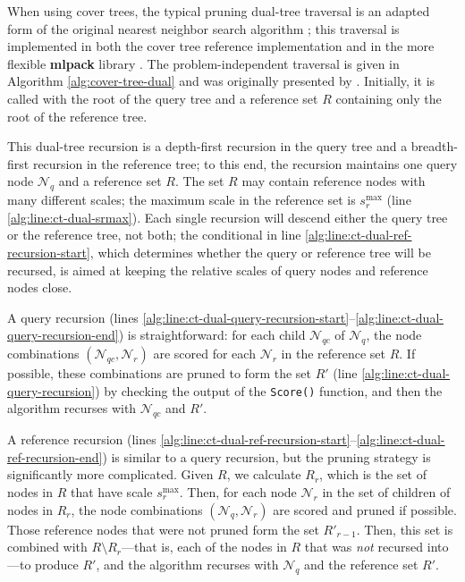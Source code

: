 When using cover trees, the typical pruning dual-tree traversal is an adapted
form of the original nearest neighbor search algorithm \citep[see
\texttt{Find-All-Nearest},][]{langford2006}; this traversal is implemented in
both the cover tree reference implementation and in the more flexible {\bf
mlpack} library \citep{mlpack2013}.  The problem-independent traversal is given
in Algorithm \ref{alg:cover-tree-dual} and was originally presented by
\citet{curtin2014dual}.  Initially, it is called with the root of the query tree
and a reference set $R$ containing only the root of the reference tree.

This dual-tree recursion is a depth-first recursion in the query tree and a
breadth-first recursion in the reference tree; to this end, the recursion
maintains one query node $\mathscr{N}_q$ and a reference set $R$.  The set $R$
may contain reference nodes with many different scales; the maximum scale in the
reference set is $s_r^{\max}$ (line \ref{alg:line:ct-dual-srmax}).  Each single
recursion will descend either the query tree or the reference tree, not both;
the conditional in line \ref{alg:line:ct-dual-ref-recursion-start}, which
determines whether the query or reference tree will be recursed, is aimed at
keeping the relative scales of query nodes and reference nodes close.

A query recursion (lines
\ref{alg:line:ct-dual-query-recursion-start}--\ref{alg:line:ct-dual-query-recursion-end})
is straightforward: for each child $\mathscr{N}_{qc}$ of $\mathscr{N}_q$, the
node combinations $(\mathscr{N}_{qc}, \mathscr{N}_r)$ are scored for each
$\mathscr{N}_r$ in the reference set $R$.  If possible, these combinations are
pruned to form the set $R'$ (line \ref{alg:line:ct-dual-query-recursion}) by
checking the output of the \texttt{Score()} function, and then the algorithm
recurses with $\mathscr{N}_{qc}$ and $R'$.

A reference recursion (lines
\ref{alg:line:ct-dual-ref-recursion-start}--\ref{alg:line:ct-dual-ref-recursion-end})
is similar to a query recursion, but the pruning strategy is significantly more
complicated.  Given $R$, we calculate $R_r$, which is the set of nodes in $R$
that have scale $s_r^{\max}$.  Then, for each node $\mathscr{N}_r$ in the set of
children of nodes in $R_r$, the node combinations $(\mathscr{N}_q,
\mathscr{N}_r)$ are scored and pruned if possible.  Those reference nodes that
were not pruned form the set $R'_{r - 1}$.  Then, this set is combined with $R
\setminus R_r$---that is, each of the nodes in $R$ that was {\em not} recursed
into---to produce $R'$, and the algorithm recurses with $\mathscr{N}_q$ and the
reference set $R'$.

